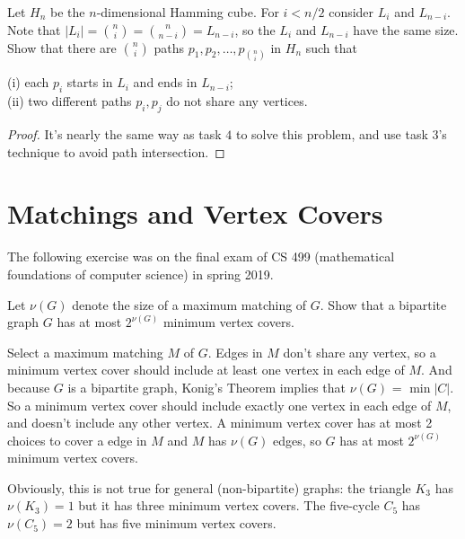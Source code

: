 \documentclass[11pt,a4paper,oneside]{article}
\begin{document}
\begin{problem}{5}
	\statement
  Let $H_n$ be the $n$-dimensional Hamming cube. For $i < n/2$ consider
  $L_i$ and $L_{n-i}$. Note that 
  $|L_i| = {n \choose i} = { n \choose n-i}  = L_{n-i}$, so the 
  $L_i$ and $L_{n-i}$ have the same size.   Show that there are ${n \choose i}$ paths $p_1,p_2,\dots,p_{ {n \choose i}}$
  in $H_n$ such that

  (i) each $p_i$ starts in $L_i$ and ends in $L_{n-i}$; \\
  (ii) two different paths $p_i,p_j$ do not share any vertices.
  
    \solution
    \begin{proof}
      It's nearly the same way as task $4$ to solve this problem, and use task $3$'s technique to avoid path intersection.  
    \end{proof}
\end{problem}


\section*{Matchings and Vertex Covers}

The following exercise was on the final exam of CS 499 (mathematical foundations of computer science) in spring 2019.

\begin{problem}{6}
	\statement
    Let $\nu(G)$ denote the size of a maximum matching of $G$. Show that a bipartite graph $G$
    has at most $2^{\nu(G)}$ minimum vertex covers.
    
    \solution
    Select a maximum matching $M$ of $G$. 
    Edges in $M$ don't share any vertex, so a minimum vertex cover should include at least one vertex in each edge of $M$. 
	And because $G$ is a bipartite graph, Konig's Theorem implies that $\nu(G)$ = $\min|C|$. 
    So a minimum vertex cover should include exactly one vertex in each edge of $M$, and doesn't include any other vertex. 
    A minimum vertex cover has at most 2 choices to cover a edge in $M$ and $M$ has $\nu(G)$ edges, 
    so $G$ has at most $2^{\nu(G)}$ minimum vertex covers. 
\end{problem}

Obviously, this is not  true for general (non-bipartite) graphs: the triangle $K_3$ has $\nu(K_3) = 1$ but it has 
three minimum vertex covers. The five-cycle $C_5$ has $\nu(C_5) = 2$ but has five minimum vertex covers.
\end{document}
